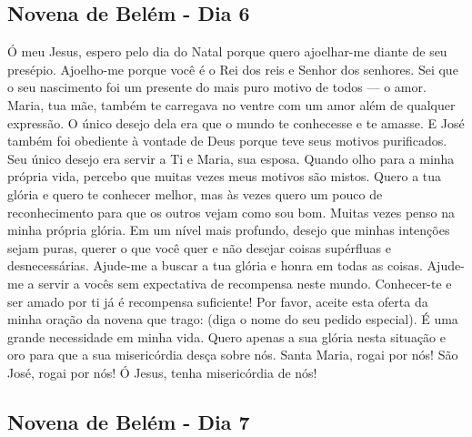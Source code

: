 \documentclass[a4paper,14pt,twoside]{extarticle} \usepackage[utf8]{inputenc}
\begin{document}
\subsection{Novena de Belém - Dia 6}

Ó meu Jesus, espero pelo dia do Natal porque quero ajoelhar-me diante de seu presépio. Ajoelho-me porque você é o Rei dos reis e Senhor dos senhores. Sei que o seu nascimento foi um presente do mais puro motivo de todos — o amor. Maria, tua mãe, também te carregava no ventre com um amor além de qualquer expressão. O único desejo dela era que o mundo te conhecesse e te amasse. E José também foi obediente à vontade de Deus porque teve seus motivos purificados. Seu único desejo era servir a Ti e Maria, sua esposa. Quando olho para a minha própria vida, percebo que muitas vezes meus motivos são mistos. Quero a tua glória e quero te conhecer melhor, mas às vezes quero um pouco de reconhecimento para que os outros vejam como sou bom. Muitas vezes penso na minha própria glória. Em um nível mais profundo, desejo que minhas intenções sejam puras, querer o que você quer e não desejar coisas supérfluas e desnecessárias. Ajude-me a buscar a tua glória e honra em todas as coisas. Ajude-me a servir a vocês sem expectativa de recompensa neste mundo. Conhecer-te e ser amado por ti já é recompensa suficiente! Por favor, aceite esta oferta da minha oração da novena que trago: (diga o nome do seu pedido especial). É uma grande necessidade em minha vida. Quero apenas a sua glória nesta situação e oro para que a sua misericórdia desça sobre nós. Santa Maria, rogai por nós! São José, rogai por nós! Ó Jesus, tenha misericórdia de nós!

\subsection{Novena de Belém - Dia 7}
\end{document}
